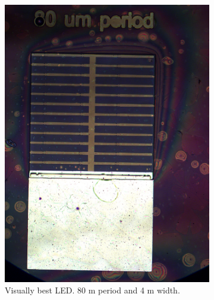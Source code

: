 \begin{figure}
    \centering
    \begin{subfigure}{0.49\linewidth}
        \centering
        \includegraphics[width=\textwidth]{figures/led_80_4_5x.jpg}
        \caption{Visually best LED. 80 \textmu m period and 4 \textmu m width.}
        \label{fig:best_led}
    \end{subfigure}
    \hfill
    \begin{subfigure}{0.49\linewidth}
        \centering

\end{subfigure}
\end{figure}
